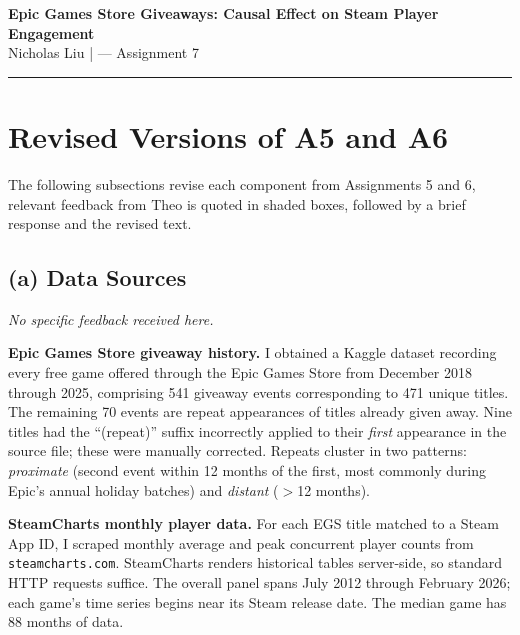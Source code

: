 \documentclass[11pt]{article}
\begin{document}
\begin{center}
  {\large\bfseries Epic Games Store Giveaways: Causal Effect on Steam Player Engagement}\\[0.4em]
  {\small Nicholas Liu \quad| --- Assignment 7}
\end{center}

\vspace{0.5em}
\hrule
\vspace{0.8em}

\section{Revised Versions of A5 and A6}

The following subsections revise each component from Assignments 5 and 6, 
relevant feedback from Theo is quoted in shaded boxes, followed by a brief response 
and the revised text.

\subsection{(a) Data Sources}

\textit{No specific feedback received here.}

\textbf{Epic Games Store giveaway history.}
I obtained a Kaggle dataset \citep{dongre2025} recording every free game
offered through the Epic Games Store from December 2018 through 2025,
comprising 541 giveaway events corresponding to 471 unique titles.
The remaining 70 events are repeat appearances of titles already given away.
Nine titles had the ``(repeat)'' suffix incorrectly applied to their
\textit{first} appearance in the source file; these were manually corrected.
Repeats cluster in two patterns: \textit{proximate} (second event within 12
months of the first, most commonly during Epic's annual holiday batches) and
\textit{distant} ($>$12 months).

\textbf{SteamCharts monthly player data.}
For each EGS title matched to a Steam App ID, I scraped monthly average and
peak concurrent player counts from \texttt{steamcharts.com}. SteamCharts
renders historical tables server-side, so standard HTTP requests suffice.
The overall panel spans July 2012 through February 2026; each game's time
series begins near its Steam release date. The median game has 88 months
of data.
\end{document}
